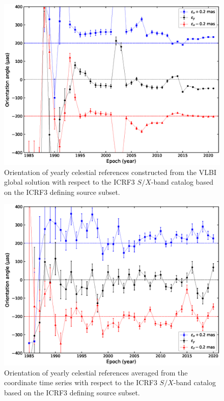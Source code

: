 \documentclass{aa}
\begin{document}
    \begin{figure}
        \centering
        \includegraphics[width=\columnwidth]{figs/orient-from-yearly-solution}
        \caption{\label{fig:rot-yearly-sol}
        Orientation of yearly celestial references constructed from the VLBI global solution with respect to the ICRF3 $S/X$-band catalog based on the ICRF3 defining source subset. 
            }
    \end{figure}
    
    \begin{figure}
        \centering
        \includegraphics[width=\columnwidth]{figs/orient-from-yearly-ts}
        \caption{\label{fig:rot-yearly-ts}   
         Orientation of yearly celestial references averaged from the coordinate time series with respect to the ICRF3 $S/X$-band catalog based on the ICRF3 defining source subset. 
         }
    \end{figure}
    
\end{document}
